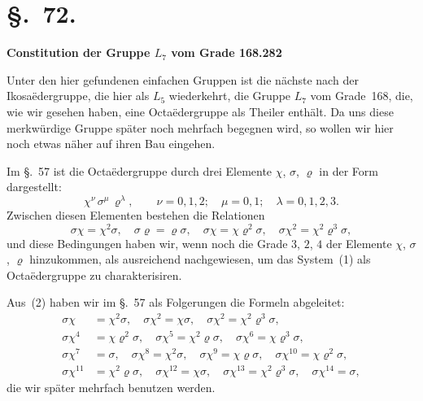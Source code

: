 \documentclass[12pt,a4paper]{article}
\begin{document}
\section*{\S.~72.}
\textbf{Constitution der Gruppe $L_7$ vom Grade 168.}\hfill\textbf{282}\\[4pt]

Unter den hier gefundenen einfachen Gruppen ist die n\"achste nach der Ikosa\"edergruppe, die hier als $L_5$ wiederkehrt, die Gruppe $L_7$ vom Grade~168, die, wie wir gesehen haben, eine Octa\"edergruppe als Theiler enth\"alt. Da uns diese merkw\"urdige Gruppe sp\"ater noch mehrfach begegnen wird, so wollen wir hier noch etwas n\"aher auf ihren Bau eingehen.

Im \S.~57 ist die Octa\"edergruppe durch drei Elemente $\chi$, $\sigma$, $\varrho$ in der Form dargestellt:
\begin{equation}
\chi^{\nu}\,\sigma^{\mu}\,\varrho^{\lambda},\qquad \nu=0,1,2;\quad \mu=0,1;\quad \lambda=0,1,2,3.
\tag{1}
\end{equation}
Zwischen diesen Elementen bestehen die Relationen
\begin{equation}
\sigma\chi = \chi^2\sigma,\quad \sigma\varrho = \varrho\sigma,\quad \sigma\chi = \chi\varrho^2\sigma,\quad \sigma\chi^2 = \chi^2\varrho^3\sigma,
\tag{2}
\end{equation}
und diese Bedingungen haben wir, wenn noch die Grade $3$, $2$, $4$ der Elemente $\chi$, $\sigma$, $\varrho$ hinzukommen, als ausreichend nachgewiesen, um das System~(1) als Octa\"edergruppe zu charakterisiren.

Aus~(2) haben wir im \S.~57 als Folgerungen die Formeln abgeleitet:
\begin{equation}
\begin{aligned}
\sigma\chi &= \chi^2\sigma,\quad \sigma\chi^2 = \chi\sigma,\quad \sigma\chi^2 = \chi^2\varrho^3\sigma,\\
\sigma\chi^4 &= \chi\varrho^2\sigma,\quad \sigma\chi^5 = \chi^2\varrho\sigma,\quad \sigma\chi^6 = \chi\varrho^3\sigma,\\
\sigma\chi^7 &= \sigma,\quad \sigma\chi^8 = \chi^2\sigma,\quad \sigma\chi^9 = \chi\varrho\sigma,\quad \sigma\chi^{10} = \chi\varrho^2\sigma,\\
\sigma\chi^{11} &= \chi^2\varrho\sigma,\quad \sigma\chi^{12} = \chi\sigma,\quad \sigma\chi^{13} = \chi^2\varrho^3\sigma,\quad \sigma\chi^{14} = \sigma,
\end{aligned}
\tag{3}
\end{equation}
die wir sp\"ater mehrfach benutzen werden.
\end{document}
